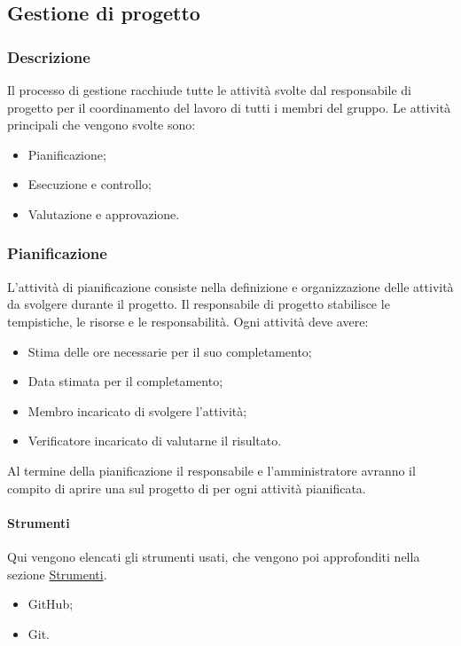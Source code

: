 \subsection{Gestione di progetto}
\label{subsec:gestione_progetto}

\subsubsection{Descrizione}
Il processo di gestione racchiude tutte le attività svolte dal responsabile di progetto per il coordinamento del lavoro di tutti i membri del gruppo.
Le attività principali che vengono svolte sono:
\begin{itemize}
    \item Pianificazione;
    \item Esecuzione e controllo;
    \item Valutazione e approvazione.
\end{itemize}

\subsubsection{Pianificazione}
L'attività di pianificazione consiste nella definizione e organizzazione delle attività da svolgere durante il progetto. 
Il responsabile di progetto stabilisce le tempistiche, le risorse e le responsabilità.
Ogni attività deve avere:
\begin{itemize}
    \item Stima delle ore necessarie per il suo completamento;
    \item Data stimata per il completamento;
    \item Membro incaricato di svolgere l'attività;
    \item Verificatore incaricato di valutarne il risultato.
\end{itemize}
Al termine della pianificazione il responsabile e l'amministratore avranno il compito di aprire una  sul progetto di  per ogni attività pianificata.

\paragraph{Strumenti}
Qui vengono elencati gli strumenti usati, che vengono poi approfonditi nella sezione \hyperref[sec:strumenti]{Strumenti}.
\begin{itemize}
    \item GitHub;
    \item Git.
\end{itemize}

